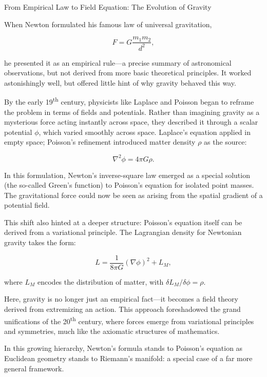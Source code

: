 \begin{HistoricalSidebar}{From Empirical Law to Field Equation: The Evolution of Gravity}

    When Newton formulated his famous law of universal gravitation,
    
    \[
    F = G \frac{m_1 m_2}{d^2},
    \]
    
    he presented it as an empirical rule—a precise summary of astronomical observations, but not derived 
    from more basic theoretical principles. It worked astonishingly well, but offered little hint of why 
    gravity behaved this way.

    \medskip
    
    By the early 19\textsuperscript{th} century, physicists like Laplace and Poisson began to reframe the 
    problem in terms of fields and potentials. Rather than imagining gravity as a mysterious force acting 
    instantly across space, they described it through a scalar potential \(\phi\), which varied smoothly 
    across space. Laplace’s equation applied in empty space; Poisson’s refinement introduced matter 
    density \(\rho\) as the source:
    
    \[
    \nabla^2 \phi = 4\pi G \rho.
    \]
    
    In this formulation, Newton’s inverse-square law emerged as a special solution (the so-called Green’s 
    function) to Poisson’s equation for isolated point masses. The gravitational force could now be 
    seen as arising from the spatial gradient of a potential field.

    \medskip
    
    This shift also hinted at a deeper structure: Poisson’s equation itself can be derived from a 
    variational principle. The Lagrangian density for Newtonian gravity takes the form:
    
    \[
    L = \frac{1}{8\pi G} (\nabla \phi)^2 + L_M,
    \]
    
    where \(L_M\) encodes the distribution of matter, with \(\delta L_M / \delta \phi = \rho\).

    \medskip
    
    Here, gravity is no longer just an empirical fact—it becomes a field theory derived from extremizing 
    an action. This approach foreshadowed the grand unifications of the 20\textsuperscript{th} century, 
    where forces emerge from variational principles and symmetries, much like the axiomatic structures 
    of mathematics.
    
    \medskip
    
    In this growing hierarchy, Newton’s formula stands to Poisson’s equation as Euclidean geometry stands 
    to Riemann’s manifold: a special case of a far more general framework.

    \medskip
\end{HistoricalSidebar}
